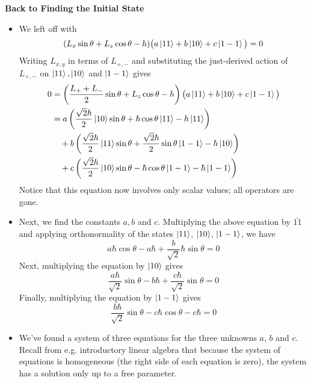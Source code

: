 \documentclass[11pt, a4paper]{article}
\begin{document}
\textbf{Back to Finding the Initial State}
\begin{itemize}
	\item We left off with
	\begin{equation*}
		(L_{x}\sin \theta + L_{z}\cos \theta - h)\big(a \ket{11} + b\ket{10} + c\ket{1-1}\big) = 0
	\end{equation*}
	Writing $ L_{x, y} $ in terms of $ L_{+,-} $ and substituting the just-derived action of $ L_{+,-} $ on $ \ket{11}, \ket{10} $ and $ \ket{1-1} $ gives
	\begin{align*}
		0 &= \left(\frac{L_{+}+L_{-}}{2}\sin \theta + L_{z}\cos \theta - h\right)\big(a \ket{11} + b\ket{10} + c\ket{1-1}\big)\\
		&=a\left(\frac{\sqrt{2}\hbar}{2}\ket{10}\sin \theta + \hbar \cos \theta \ket{11} - h\ket{11}\right) \\
		&{} \quad + b\left(\frac{\sqrt{2}\hbar}{2}\ket{11}\sin \theta + \frac{\sqrt{2}\hbar}{2}\sin \theta\ket{1-1} - \hbar\ket{10}\right)\\
		&{} \quad + c\left(\frac{\sqrt{2}\hbar}{2}\ket{10}\sin \theta -\hbar \cos \theta\ket{1-1} - \hbar\ket{1-1}\right)
	\end{align*}
	Notice that this equation now involves only scalar values; all operators are gone.
	
	\item Next, we find the constants $ a, b $ and $ c $. Multiplying the above equation by $ \bar{11} $ and applying orthonormality of the states $ \ket{11} $, $ \ket{10} $, $ \ket{1-1} $, we have
	\begin{equation*}
		a \hbar \cos \theta - a \hbar + \frac{b}{\sqrt{2}}\hbar \sin \theta = 0
	\end{equation*}
	Next, multiplying the equation by $ \ket{10} $ gives
	\begin{equation*}
		\frac{a\hbar}{\sqrt{2}}\sin \theta - b \hbar + \frac{c\hbar}{\sqrt{2}}\sin \theta = 0
	\end{equation*}
	Finally, multiplying the equation by $ \ket{1-1} $ gives
	\begin{equation*}
		\frac{b\hbar}{\sqrt{2}} \sin \theta - c\hbar \cos \theta - c\hbar = 0
	\end{equation*}
	
	\item We've found a system of three equations for the three unknowns $ a $, $ b $ and $ c $. Recall from e.g. introductory linear algebra that because the system of equations is homogeneous (the right side of each equation is zero), the system has a solution only up to a free parameter. 
	

\end{itemize}
\end{document}
